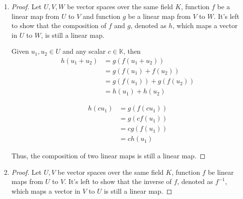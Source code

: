 \documentclass[paper=a4, fontsize=11pt]{scrartcl} %
\numberwithin{equation}{section} %
\numberwithin{figure}{section} %
\numberwithin{table}{section} %
\begin{document}
\begin{enumerate}
\begin{proof}
			Since $\{u_1, u_2, ... , u_m, v_1, v_2, ... , v_n \}$ forms the basis of $V_1$, all the coefficients in (\ref{diff}) should be 0. Thus, (\ref{cdis}) is valid if and only if all the coefficents $c_i$ is 0, which implies that $\{f(v_1), f(v_2), ... , f(v_n)\}$ are linearly independent.
			
			Thus, $\{f(v_1), f(v_2), ... , f(v_n)\}$ forms the basis of $V_2$, and the dimension of $V_2$ is therefore $n$. The rank-nullity theorem written as below is proved.
			\begin{equation}
				dim(V_1) = dim(ker(f)) + dim(V_2)
			\end{equation}
		\end{proof}
	
	\item
		\begin{proof}
			Let $U, V, W$ be vector spaces over the same field $K$, function $f$ be a linear map from $U$ to $V$ and function $g$ be a linear map from $V$ to $W$. It's left to show that the composition of $f$ and $g$, denoted as $h$, which maps a vector in $U$ to $W$, is still a linear map.
			
			Given $u_1, u_2 \in U$ and any scalar $c \in \mathbb{K}$, then
			\begin{equation}
				\begin{aligned}
					h(u_1 + u_2) & = g(f(u_1 + u_2)) \\
								 & = g(f(u_1) + f(u_2)) \\
								 & = g(f(u_1)) + g(f(u_2)) \\
								 & = h(u_1) + h(u_2)
				\end{aligned}
			\end{equation}
			
			\begin{equation}
				\begin{aligned}
					h(c u_1) & = g(f(c u_1)) \\
							 & = g(c f(u_1)) \\
						     & = c g(f(u_1)) \\
							 & = c h(u_1)
				\end{aligned}
			\end{equation}
			
			Thus, the composition of two linear maps is still a linear map.
		\end{proof}
	
	\item
		\begin{proof}
			Let $U, V$ be vector spaces over the same field $K$, function $f$ be linear maps from $U$ to $V$. It's left to show that the inverse of $f$, denoted as $f^{-1}$, which maps a vector in $V$ to $U$ is still a linear map.
			

\end{proof}
\end{enumerate}
\end{document}
